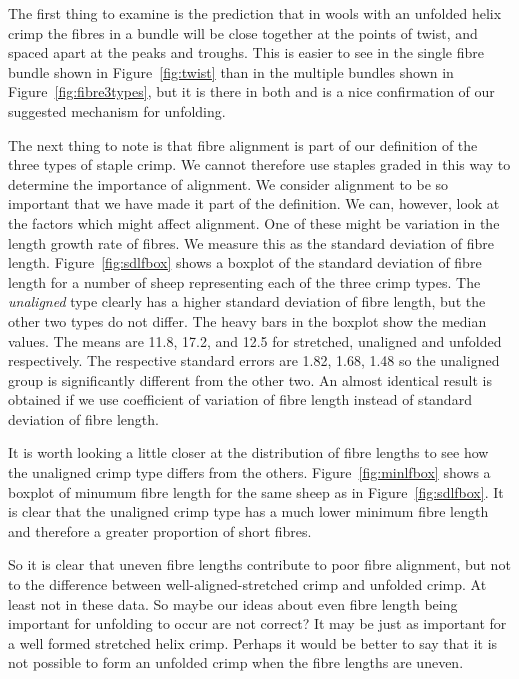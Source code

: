 \documentclass[titlepage,10pt]{article}  %
\begin{document}
The first thing to examine is the prediction that in wools with an unfolded helix crimp the fibres in a bundle will be close together at the points of twist, and spaced apart at the peaks and troughs. This is easier to see in the single fibre bundle shown in Figure~\ref{fig:twist} than in the multiple bundles shown in  Figure~\ref{fig:fibre3types}, but it is there in both and is a nice confirmation of our suggested mechanism for unfolding.

The next thing to note is that fibre alignment is part of our definition of the three types of staple crimp. We cannot therefore use staples graded in this way to determine the importance of alignment. We consider alignment to be so important that we have made it part of the definition. We can, however, look at the factors which might affect alignment. One of these might be variation in the length growth rate of fibres. We measure this as the standard deviation of fibre length. Figure~\ref{fig:sdlfbox} shows a boxplot of the standard deviation of fibre length for a number of sheep representing each of the three crimp types. The {\em unaligned} type clearly has a higher standard deviation of fibre length, but the other two types do not differ. The heavy bars in the boxplot show the median values. The means are 11.8, 17.2, and 12.5 for stretched, unaligned and unfolded respectively. The respective standard errors are 1.82, 1.68, 1.48 so the unaligned group is significantly different from the other two. An almost identical result is obtained if we use coefficient of variation of fibre length instead of standard deviation of fibre length.



It is worth looking a little closer at the distribution of fibre lengths to see how the unaligned crimp type differs from the others. Figure~\ref{fig:minlfbox} shows a boxplot of minumum fibre length for the same sheep as in Figure~\ref{fig:sdlfbox}. It is clear that the unaligned crimp type has a much lower minimum fibre length and therefore a greater proportion of short fibres. 


 
So it is clear that uneven fibre lengths contribute to poor fibre alignment, but not to the difference between well-aligned-stretched crimp and unfolded crimp. At least not in these data. So maybe our ideas about even fibre length being important for unfolding to occur are not correct? It may be just as important for a well formed stretched helix crimp. Perhaps  it would be better to say that it is not possible to form an unfolded crimp when the fibre lengths are uneven.
\end{document}

